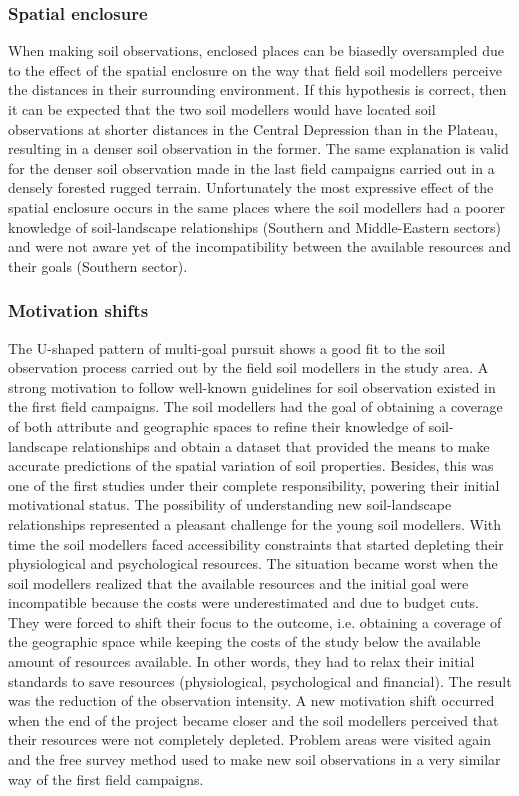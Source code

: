 \subsubsection{Spatial enclosure}

When making soil observations, enclosed places can be biasedly oversampled due to the effect of the spatial 
enclosure on the way that field soil modellers perceive the distances in their surrounding environment. If 
this hypothesis is correct, then it can be expected that the two soil modellers would have located soil 
observations at shorter distances in the Central Depression than in the Plateau, resulting in a denser soil 
observation in the former. The same explanation is valid for the denser soil observation made in the last field
campaigns carried out in a densely forested rugged terrain. Unfortunately the most expressive effect of the 
spatial enclosure occurs in the same places where the soil modellers had a poorer knowledge of soil-landscape 
relationships (Southern and Middle-Eastern sectors) and were not aware yet of the incompatibility between the 
available resources and their goals (Southern sector).

\subsubsection{Motivation shifts}

The U-shaped pattern of multi-goal pursuit shows a good fit to the soil observation process carried out by the 
field soil modellers in the study area. A strong motivation to follow well-known guidelines for soil 
observation existed in the first field campaigns. The soil modellers had the goal of obtaining a coverage of 
both attribute and geographic spaces to refine their knowledge of soil-landscape relationships and obtain a 
dataset that provided the means to make accurate predictions of the spatial variation of soil properties. 
Besides, this was one of the first studies under their complete responsibility, powering their initial 
motivational status. The possibility of understanding new soil-landscape relationships represented
a pleasant challenge for the young soil modellers. With time the soil modellers faced accessibility 
constraints that started depleting their physiological and psychological resources. The situation became worst 
when the soil modellers realized that the available resources and the initial goal were incompatible because 
the costs were underestimated and due to budget cuts. They were forced to shift their focus to the outcome, 
i.e. obtaining a  coverage of the geographic space while keeping the costs of the study 
below the available amount of resources available. In other words, they had to relax their initial standards 
to save resources (physiological, psychological and financial). The result was the reduction of the 
observation intensity. A new motivation shift occurred when the end of the project became closer and the soil 
modellers perceived that their resources were not completely depleted. Problem areas were visited again and 
the free survey method used to make new soil observations in a very similar way of the first field campaigns.

